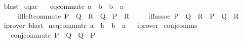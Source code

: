 \begin{isabellebody}
%
\isatagproof
{}\isamarkupfalse%
\ blast%
\endisatagproof
{\isafoldproof}%
%
\isadelimproof
\isanewline
%
\endisadelimproof
\isanewline
{}\isamarkupfalse%
\ eq{\isacharunderscore}{\kern0pt}ac{\isacharcolon}{\kern0pt}\isanewline
\ \ \ eq{\isacharunderscore}{\kern0pt}commute{\isacharcolon}{\kern0pt}\ {\isachardoublequoteopen}a\ {\isacharequal}{\kern0pt}\ b\ {\isasymlongleftrightarrow}\ b\ {\isacharequal}{\kern0pt}\ a{\isachardoublequoteclose}\isanewline
\ \ \ \ \ iff{\isacharunderscore}{\kern0pt}left{\isacharunderscore}{\kern0pt}commute{\isacharcolon}{\kern0pt}\ {\isachardoublequoteopen}{\isacharparenleft}{\kern0pt}P\ {\isasymlongleftrightarrow}\ {\isacharparenleft}{\kern0pt}Q\ {\isasymlongleftrightarrow}\ R{\isacharparenright}{\kern0pt}{\isacharparenright}{\kern0pt}\ {\isasymlongleftrightarrow}\ {\isacharparenleft}{\kern0pt}Q\ {\isasymlongleftrightarrow}\ {\isacharparenleft}{\kern0pt}P\ {\isasymlongleftrightarrow}\ R{\isacharparenright}{\kern0pt}{\isacharparenright}{\kern0pt}{\isachardoublequoteclose}\isanewline
\ \ \ \ \ iff{\isacharunderscore}{\kern0pt}assoc{\isacharcolon}{\kern0pt}\ {\isachardoublequoteopen}{\isacharparenleft}{\kern0pt}{\isacharparenleft}{\kern0pt}P\ {\isasymlongleftrightarrow}\ Q{\isacharparenright}{\kern0pt}\ {\isasymlongleftrightarrow}\ R{\isacharparenright}{\kern0pt}\ {\isasymlongleftrightarrow}\ {\isacharparenleft}{\kern0pt}P\ {\isasymlongleftrightarrow}\ {\isacharparenleft}{\kern0pt}Q\ {\isasymlongleftrightarrow}\ R{\isacharparenright}{\kern0pt}{\isacharparenright}{\kern0pt}{\isachardoublequoteclose}\isanewline
%
\isadelimproof
\ \ %
\endisadelimproof
%
\isatagproof
{}\isamarkupfalse%
\ {\isacharparenleft}{\kern0pt}iprover{\isacharcomma}{\kern0pt}\ blast{\isacharplus}{\kern0pt}{\isacharparenright}{\kern0pt}%
\endisatagproof
{\isafoldproof}%
%
\isadelimproof
\isanewline
%
\endisadelimproof
\isanewline
{}\isamarkupfalse%
\ neq{\isacharunderscore}{\kern0pt}commute{\isacharcolon}{\kern0pt}\ {\isachardoublequoteopen}a\ {\isasymnoteq}\ b\ {\isasymlongleftrightarrow}\ b\ {\isasymnoteq}\ a{\isachardoublequoteclose}%
\isadelimproof
\ %
\endisadelimproof
%
\isatagproof
{}\isamarkupfalse%
\ iprover%
\endisatagproof
{\isafoldproof}%
%
\isadelimproof
%
\endisadelimproof
\isanewline
\isanewline
{}\isamarkupfalse%
\ conj{\isacharunderscore}{\kern0pt}comms{\isacharcolon}{\kern0pt}\isanewline
\ \ \ conj{\isacharunderscore}{\kern0pt}commute{\isacharcolon}{\kern0pt}\ {\isachardoublequoteopen}P\ {\isasymand}\ Q\ {\isasymlongleftrightarrow}\ Q\ {\isasymand}\ P{\isachardoublequoteclose}\isanewline

\end{isabellebody}
